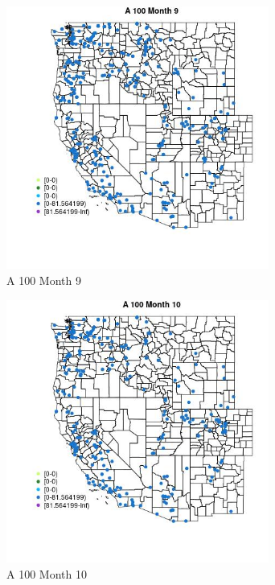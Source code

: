 \begin{figure} 
\centering  
\includegraphics[width=0.77\textwidth]{Code_Outputs/Report_ML_input_PM25_Step4_part_e_de_duplicated_aveswNAs_MapObsMo9A_100.jpg} 
\caption{\label{fig:Report_ML_input_PM25_Step4_part_e_de_duplicated_aveswNAsMapObsMo9A_100}A 100 Month 9} 
\end{figure} 
 

\begin{figure} 
\centering  
\includegraphics[width=0.77\textwidth]{Code_Outputs/Report_ML_input_PM25_Step4_part_e_de_duplicated_aveswNAs_MapObsMo10A_100.jpg} 
\caption{\label{fig:Report_ML_input_PM25_Step4_part_e_de_duplicated_aveswNAsMapObsMo10A_100}A 100 Month 10} 
\end{figure} 
 

